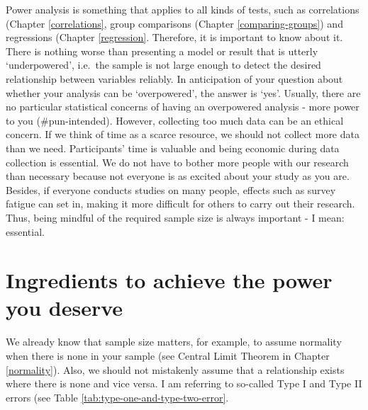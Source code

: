 \documentclass[
]{book}
\begin{document}
Power analysis is something that applies to all kinds of tests, such as correlations (Chapter \ref{correlations}, group comparisons (Chapter \ref{comparing-groups}) and regressions (Chapter \ref{regression}. Therefore, it is important to know about it. There is nothing worse than presenting a model or result that is utterly `underpowered', i.e.~the sample is not large enough to detect the desired relationship between variables reliably. In anticipation of your question about whether your analysis can be `overpowered', the answer is `yes'. Usually, there are no particular statistical concerns of having an overpowered analysis - more power to you (\#pun-intended). However, collecting too much data can be an ethical concern. If we think of time as a scarce resource, we should not collect more data than we need. Participants' time is valuable and being economic during data collection is essential. We do not have to bother more people with our research than necessary because not everyone is as excited about your study as you are. Besides, if everyone conducts studies on many people, effects such as survey fatigue can set in, making it more difficult for others to carry out their research. Thus, being mindful of the required sample size is always important - I mean: essential.

\hypertarget{ingredients-power-analysis}{%
\section{Ingredients to achieve the power you deserve}\label{ingredients-power-analysis}}

We already know that sample size matters, for example, to assume normality when there is none in your sample (see Central Limit Theorem in Chapter \ref{normality}). Also, we should not mistakenly assume that a relationship exists where there is none and vice versa. I am referring to so-called Type I and Type II errors (see Table \ref{tab:type-one-and-type-two-error}.
\end{document}
